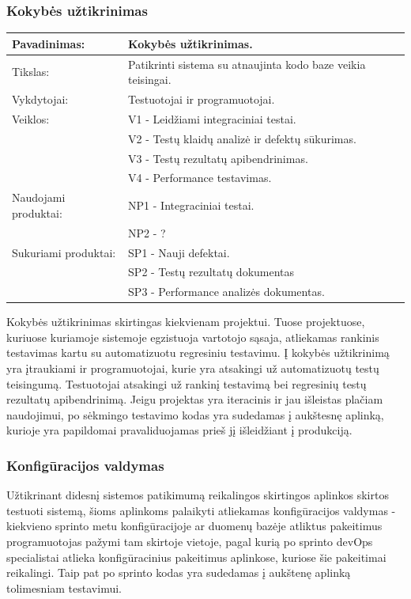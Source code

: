 \documentclass{VUMIFPSkursinis}
\begin{document}
	\subsubsection{Kokybės užtikrinimas}
	\begin{center}
		\begin{tabular}{ | l | l | } 
		\hline
		Pavadinimas:         & Kokybės užtikrinimas.                                       \\ \hline
		Tikslas: 	           & Patikrinti sistema su atnaujinta kodo baze veikia teisingai. \\ \hline
		Vykdytojai:          & Testuotojai ir programuotojai.                                \\ \hline
		Veiklos:             & V1 - Leidžiami integraciniai testai. 													\\
						             & V2 - Testų klaidų analizė ir defektų sūkurimas. 								 \\
					 	             & V3 - Testų rezultatų apibendrinimas. 														\\ 
						    				 & V4 - Performance testavimas. 																		 \\ \hline
		Naudojami produktai: & NP1 - Integraciniai testai. 																				\\
												 &	 NP2 - ?																													 \\ \hline
		Sukuriami produktai: & SP1 - Nauji defektai. 																								\\
												 &	 SP2 - Testų rezultatų dokumentas 																	 \\
												 &	 SP3 - Performance analizės dokumentas. 															\\ \hline
		\end{tabular}
		\end{center}
	Kokybės užtikrinimas skirtingas kiekvienam projektui. Tuose projektuose, kuriuose kuriamoje sistemoje egzistuoja vartotojo sąsaja, atliekamas rankinis testavimas kartu su automatizuotu regresiniu testavimu. Į kokybės užtikrinimą yra įtraukiami ir programuotojai, kurie yra atsakingi už automatizuotų testų teisingumą. Testuotojai atsakingi už rankinį testavimą bei regresinių testų rezultatų apibendrinimą. Jeigu projektas yra iteracinis ir jau išleistas plačiam naudojimui, po sėkmingo testavimo kodas yra sudedamas į aukštesnę aplinką, kurioje yra papildomai pravaliduojamas prieš jį išleidžiant į produkciją.
	\subsubsection{Konfigūracijos valdymas}
	Užtikrinant didesnį sistemos patikimumą reikalingos skirtingos aplinkos skirtos testuoti sistemą, šioms aplinkoms palaikyti atliekamas konfigūracijos valdymas - kiekvieno sprinto metu konfigūracijoje ar duomenų bazėje atliktus pakeitimus programuotojas pažymi tam skirtoje vietoje, pagal kurią po sprinto devOps specialistai atlieka konfigūracinius pakeitimus aplinkose, kuriose šie pakeitimai reikalingi. Taip pat po sprinto kodas yra sudedamas į aukštenę aplinką tolimesniam testavimui.
\end{document}

